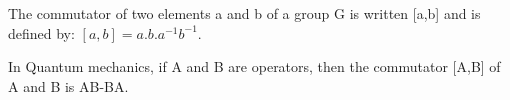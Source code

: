 The commutator of two elements a and b of a group G is written [a,b] and is
defined by: $[a,b]=a.b.a^{-1}b^{-1}.$ 
\par
In Quantum mechanics, if A and B are operators, then the commutator [A,B]
of A and B is AB-BA.